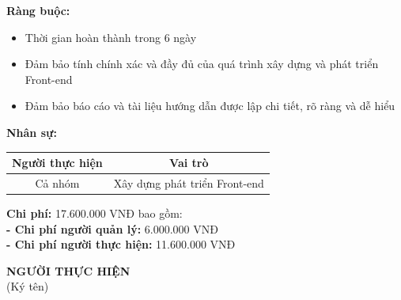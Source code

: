 {\begin{minipage}{\textwidth}
\begin{itemize}
        \end{itemize}
        \noindent \textbf{Ràng buộc:}
        \begin{itemize}
            \item Thời gian hoàn thành trong 6 ngày
            \item Đảm bảo tính chính xác và đầy đủ của quá trình xây dựng và phát triển Front-end
            \item Đảm bảo báo cáo và tài liệu hướng dẫn được lập chi tiết, rõ ràng và dễ hiểu
        \end{itemize}
        \noindent \textbf{Nhân sự:}
        \begin{longtable}{|c|c|}
        \hline
        \textbf{Người thực hiện} & \textbf{Vai trò} \\
        \hline
        Cả nhóm & Xây dựng phát triển Front-end \\
        \hline
        \end{longtable}
        \noindent \textbf{Chi phí:} 17.600.000 VNĐ bao gồm:\\
        \noindent \textbf{  - Chi phí người quản lý:} 6.000.000 VNĐ \\
        \noindent \textbf{  - Chi phí người thực hiện:} 11.600.000 VNĐ
        \begin{flushleft}
            \hspace{8cm} \textbf{NGƯỜI THỰC HIỆN} \\
            \hspace{9.5cm} (Ký tên) \\
            \vspace{1cm}
        \end{flushleft}
	\end{minipage}
}    
